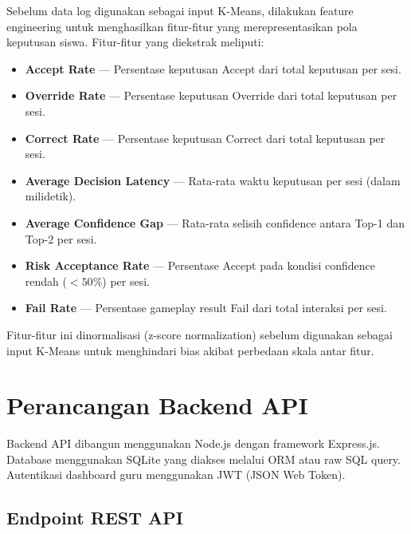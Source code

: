 Sebelum data log digunakan sebagai input K-Means, dilakukan feature engineering untuk menghasilkan fitur-fitur yang merepresentasikan pola keputusan siswa. Fitur-fitur yang diekstrak meliputi:

\begin{itemize}
    \item \textbf{Accept Rate} --- Persentase keputusan Accept dari total keputusan per sesi.
    \item \textbf{Override Rate} --- Persentase keputusan Override dari total keputusan per sesi.
    \item \textbf{Correct Rate} --- Persentase keputusan Correct dari total keputusan per sesi.
    \item \textbf{Average Decision Latency} --- Rata-rata waktu keputusan per sesi (dalam milidetik).
    \item \textbf{Average Confidence Gap} --- Rata-rata selisih confidence antara Top-1 dan Top-2 per sesi.
    \item \textbf{Risk Acceptance Rate} --- Persentase Accept pada kondisi confidence rendah ($<50\%$) per sesi.
    \item \textbf{Fail Rate} --- Persentase gameplay result Fail dari total interaksi per sesi.
\end{itemize}

Fitur-fitur ini dinormalisasi (z-score normalization) sebelum digunakan sebagai input K-Means untuk menghindari bias akibat perbedaan skala antar fitur.


\section{Perancangan Backend API}

Backend API dibangun menggunakan Node.js dengan framework Express.js. Database menggunakan SQLite yang diakses melalui ORM atau raw SQL query. Autentikasi dashboard guru menggunakan JWT (JSON Web Token).

\subsection{Endpoint REST API}

